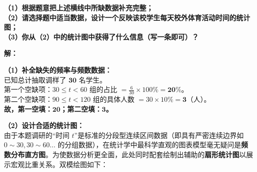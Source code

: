 \vspace{0.2cm}
\textbf{（1）根据题意把上述横线中所缺数据补充完整；\\
（2）请选择题中适当数据，设计一个反映该校学生每天校外体育活动时间的统计图；\\
（3）你从（2）中的统计图中获得了什么信息（写一条即可）？}

\vspace{0.4cm}
\textbf{解：}

\textbf{（1）补全缺失的频率与频数数据：} \\
已知总计抽取调样了 $\boldsymbol{30}$ 名学生。\\
第一个空缺项：$30 \leqslant t < 60$ 组的占比 $= \displaystyle\frac{6}{30} \times 100\% = \boldsymbol{20\%}$。\\
第二个空缺项：$90 \leqslant t < 120$ 组的具体人数 $= 30 \times 10\% = \boldsymbol{3}$（人）。\\
\textbf{故，第一空填：$\boldsymbol{20}$；第二空填：$\boldsymbol{3}$。}

\vspace{0.4cm}
\textbf{（2）设计合适的统计图：} \\
由于本题调研的“时间 $t$”是标准的分段型连续区间数据（即具有严密连续边界如 $0{\sim}30, 30{\sim}60\dots$ 的分组数据），在统计学中最科学直观的图表模型毫无疑问是\textbf{频数分布直方图}。为使数据分析更全面，此处同时配套绘制出辅助的\textbf{扇形统计图}以展示宏观比重关系。双模绘图如下：

